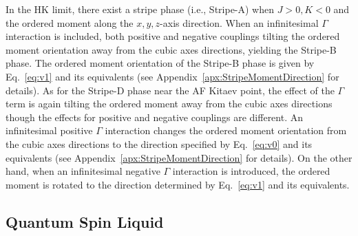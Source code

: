 \documentclass[aps,prb,reprint,amsfonts,amsmath,amssymb,showpacs,groupedaddress,superscriptaddress]{revtex4-1}
\begin{document}
In the HK limit, there exist a stripe phase (i.e., Stripe-A) when $J>0, K<0$ and the ordered moment along the $x,y,z$-axis direction. When an infinitesimal $\Gamma$ interaction is included, both positive and negative couplings tilting the ordered moment orientation away from the cubic axes directions, yielding the Stripe-B phase. The ordered moment orientation of the Stripe-B phase is given by Eq.~\eqref{eq:v1} and its equivalents (see Appendix~\ref{apx:StripeMomentDirection} for details). As for the Stripe-D phase near the AF Kitaev point, the effect of the $\Gamma$ term is again tilting the ordered moment away from the cubic axes directions though the effects for positive and negative couplings are different. An infinitesimal positive $\Gamma$ interaction changes the ordered moment orientation from the cubic axes directions to the direction specified by Eq.~\eqref{eq:v0} and its equivalents (see Appendix~\ref{apx:StripeMomentDirection} for details). On the other hand, when an infinitesimal negative $\Gamma$ interaction is introduced, the ordered moment is rotated to the direction determined by Eq.~\eqref{eq:v1} and its equivalents.

\subsection{\label{subsec:QSL}Quantum Spin Liquid}
\end{document}

